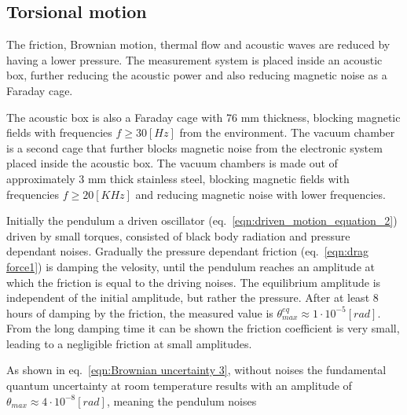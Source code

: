 \documentclass[\main/master.tex]{subfiles}
\begin{document}
\subsection{Torsional motion}
The friction, Brownian motion, thermal flow and acoustic waves are reduced by having a lower pressure. The measurement system is placed inside an acoustic box, further reducing the acoustic power and also reducing magnetic noise as a Faraday cage. 
\par\noindent
The acoustic box is also a Faraday cage with 76 mm thickness, blocking magnetic fields with frequencies $f \ge 30 [Hz]$ from the environment. The vacuum chamber is a second cage that further blocks magnetic noise from the electronic system placed inside the acoustic box. The vacuum chambers is made out of approximately 3 mm thick stainless steel, blocking magnetic fields with frequencies $f\ge 20 [KHz]$ and reducing magnetic noise with lower frequencies.
\par\noindent
Initially the pendulum a driven oscillator (eq.~\ref{eqn:driven_motion_equation_2}) driven by small torques, consisted of black body radiation and pressure dependant noises. Gradually the pressure dependant friction (eq.~\ref{eqn:drag force1}) is damping the velosity, until the pendulum reaches an amplitude at which the friction is equal to the driving noises. The equilibrium amplitude is independent of the initial amplitude, but rather the pressure. After at least 8 hours of damping by the friction, the measured value is $\theta_{max}^{eq}\approx 1\cdot10^{-5}[rad]$. From the long damping time it can be shown the friction coefficient is very small, leading to a negligible friction at small amplitudes.
\par\noindent
As shown in eq.~\ref{eqn:Brownian uncertainty 3}, without noises the fundamental quantum uncertainty at room temperature results with an amplitude of  $\theta_{max}  \approx 4\cdot 10^{-8} [rad] $, meaning the pendulum noises  
\par\noindent
 
\par\noindent
\end{document}
